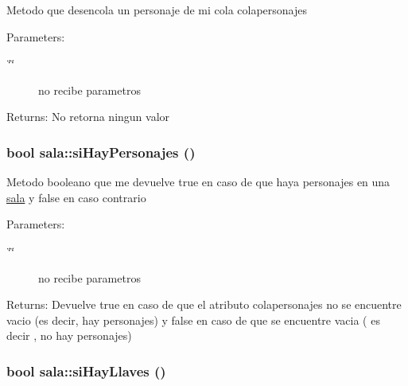 Metodo que desencola un personaje de mi cola colapersonajes \begin{Desc}
\item[Parameters:]
\begin{description}
\item[{\em \char`\"{}\char`\"{}}]no recibe parametros \end{description}
\end{Desc}
\begin{Desc}
\item[Returns:]No retorna ningun valor \end{Desc}
\hypertarget{classsala_0b13578fe6d2a10d6102920dfc9216b0}{
\subsubsection[siHayPersonajes]{\setlength{\rightskip}{0pt plus 5cm}bool sala::siHayPersonajes ()}}
\label{classsala_0b13578fe6d2a10d6102920dfc9216b0}


Metodo booleano que me devuelve true en caso de que haya personajes en una \hyperlink{classsala}{sala} y false en caso contrario \begin{Desc}
\item[Parameters:]
\begin{description}
\item[{\em \char`\"{}\char`\"{}}]no recibe parametros \end{description}
\end{Desc}
\begin{Desc}
\item[Returns:]Devuelve true en caso de que el atributo colapersonajes no se encuentre vacio (es decir, hay personajes) y false en caso de que se encuentre vacia ( es decir , no hay personajes) \end{Desc}
\hypertarget{classsala_deee4cbad1198682fd86962d35aea256}{
\subsubsection[siHayLlaves]{\setlength{\rightskip}{0pt plus 5cm}bool sala::siHayLlaves ()}}
\label{classsala_deee4cbad1198682fd86962d35aea256}


